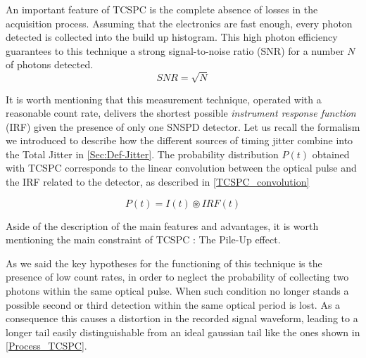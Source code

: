 An important feature of TCSPC is the complete absence of losses in the acquisition process. Assuming that the electronics are fast enough, every photon detected is collected into the build up histogram. This high photon efficiency guarantees to this technique a strong signal-to-noise ratio (SNR) for a number $N$ of photons detected.
\begin{equation}
SNR = \sqrt{N}
\label{SNR_TCSPC}
\end{equation}

It is worth mentioning that this measurement technique, operated with a reasonable count rate, delivers the shortest possible \emph{instrument response function} (IRF) given the presence of only one SNSPD detector.
Let us recall the formalism we introduced to describe how the different sources of timing jitter combine into the Total Jitter in \autoref{Sec:Def-Jitter}.
The probability distribution $P(t)$ obtained with TCSPC corresponds to the linear convolution between the optical pulse and the IRF related to the detector, as described in \autoref{TCSPC_convolution}

\begin{equation}
    P(t) = I(t) \circledast IRF(t)
\label{TCSPC_convolution}
\end{equation}
 
Aside of the description of the main features and advantages, it is worth mentioning the main constraint of TCSPC : The Pile-Up effect.

As we said the key hypotheses for the functioning of this technique is the presence of low count rates, in order to neglect the probability of collecting two photons within the same optical pulse.
When such condition no longer stands a possible second or third detection within the same optical period is lost.
As a consequence this causes a distortion in the recorded signal waveform, leading to a longer tail easily distinguishable from an ideal gaussian tail like the ones shown in \autoref{Process_TCSPC}.





